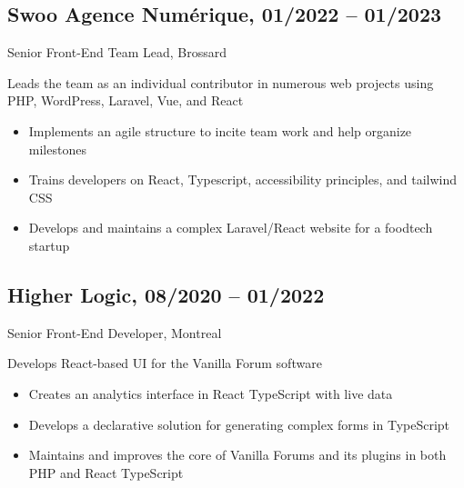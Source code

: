 \documentclass{article}
\begin{document}
\begin{paracol}{2}
\begin{rightcolumn}
    \vspace{1em}

    \subsection{Swoo Agence Numérique, 01/2022 -- 01/2023}
    {Senior Front-End Team Lead, Brossard\par}
    {
      Leads the team as an individual contributor in numerous web projects using PHP, WordPress, Laravel, Vue, and React
    \par}
    \begin{itemize}
      \item Implements an agile structure to incite team work and help organize milestones
      \item Trains developers on React, Typescript, accessibility principles, and tailwind CSS
      \item Develops and maintains a complex Laravel/React website for a foodtech startup
    \end{itemize}

    \pagebreak

    \subsection{Higher Logic, 08/2020 -- 01/2022}
    {Senior Front-End Developer, Montreal\par}
    {
      Develops React-based UI for the Vanilla Forum software
    \par}
    \begin{itemize}
      \item Creates an analytics interface in React TypeScript with live data
      \item Develops a declarative solution for generating complex forms in TypeScript
      \item Maintains and improves the core of Vanilla Forums and its plugins in both PHP and React TypeScript
    \end{itemize}

    \vspace{1em}


\end{rightcolumn}
\end{paracol}
\end{document}
